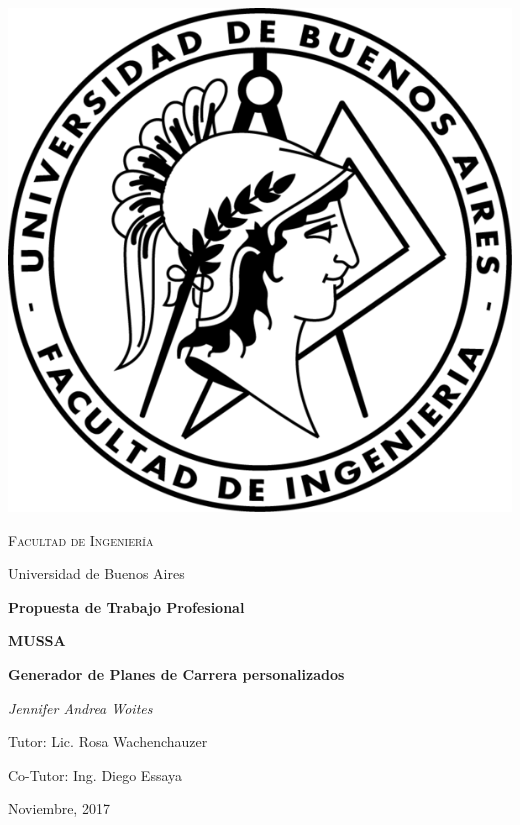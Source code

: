 \documentclass[a4paper]{article}
\begin{document}

\begin{titlepage}
	\centering
	\includegraphics{Imagenes/logo_fiuba.png}\par\vspace{1cm}
	{\scshape\LARGE Facultad de Ingeniería \par
	Universidad de Buenos Aires  \par}
	\vspace{1.5cm}
	{\Large\bfseries Propuesta de Trabajo Profesional\par}
	\vspace{1.5cm}
	{\huge\bfseries MUSSA \par}
	\vspace{0.5cm}
	{\huge\bfseries Generador de Planes de Carrera personalizados\par}
	\vspace{1cm}
	{\Large\itshape Jennifer Andrea Woites\par}
	\vfill
	{\Large
	Tutor: Lic. Rosa Wachenchauzer \par
	\vspace{0.3cm}
	Co-Tutor: Ing. Diego Essaya}
	\vfill
	{\large Noviembre, 2017 \par}
\end{titlepage}
\end{document}
